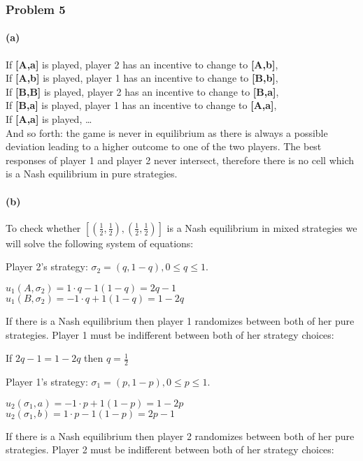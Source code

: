 \documentclass[]{article}
\let\oldparagraph\paragraph
\renewcommand{\paragraph}[1]{\oldparagraph{#1}\mbox{}}
\begin{document}
\subsubsection{Problem 5}\label{problem-5}

\paragraph{(a)}\label{a}

If \textbf{[A,a]} is played, player 2 has an incentive to change to
\textbf{[A,b]},\\
If \textbf{[A,b]} is played, player 1 has an incentive to change to
\textbf{[B,b]},\\
If \textbf{[B,B]} is played, player 2 has an incentive to change to
\textbf{[B,a]},\\
If \textbf{[B,a]} is played, player 1 has an incentive to change to
\textbf{[A,a]},\\
If \textbf{[A,a]} is played, \ldots{}\\
And so forth: the game is never in equilibrium as there is always a
possible deviation leading to a higher outcome to one of the two
players. The best responses of player 1 and player 2 never intersect, therefore there is no cell which is a Nash equilibrium in pure strategies.

\paragraph{(b)}\label{b}

To check whether $[(\frac{1}{2},\frac{1}{2}),(\frac{1}{2},\frac{1}{2})] $ is a Nash equilibrium in mixed strategies we will solve the following system of equations:

Player 2's strategy: $\sigma_2=(q,1-q),0\leq q\leq 1$.

$u_1(A,\sigma_2)=1\cdot q-1(1-q)=2q-1$\\
$u_1(B,\sigma_2)=-1\cdot q+1(1-q)=1-2q$

If there is a Nash equilibrium then player 1 randomizes between both of her pure strategies. Player 1 must be indifferent between both of her strategy choices:

If $2q-1=1-2q$ then $q=\frac{1}{2}$

Player 1's strategy: $\sigma_1=(p,1-p),0\leq p\leq 1$.

$u_2(\sigma_1,a)=-1\cdot p+1(1-p)=1-2p$\\
$u_2(\sigma_1,b)=1\cdot p-1(1-p)=2p-1$

If there is a Nash equilibrium then player 2 randomizes between both of her pure strategies. Player 2 must be indifferent between both of her strategy choices:
\end{document}
